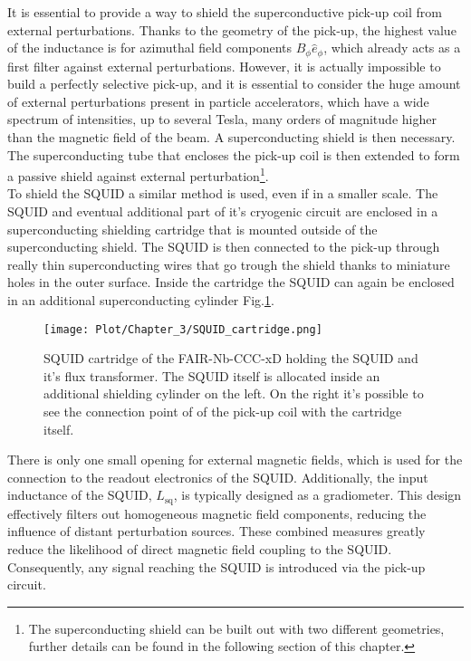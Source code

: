\documentclass[12pt,a4paper]{report}
\begin{document}
    It is essential to provide a way to shield the superconductive pick-up coil from external perturbations. Thanks to the geometry of the pick-up, the highest value of the inductance is for azimuthal field components \( B_{\phi} \hat{e}_{\phi} \), which already acts as a first filter against external perturbations. However, it is actually impossible to build a perfectly selective pick-up, and it is essential to consider the huge amount of external perturbations present in particle accelerators, which have a wide spectrum of intensities, up to several Tesla, many orders of magnitude higher than the magnetic field of the beam. A superconducting shield is then necessary. The superconducting tube that encloses the pick-up coil is then extended to form a passive shield against external perturbation\footnote{The superconducting shield can be built out with two different geometries, further details can be found in the following section of this chapter.}. \\
     To shield the SQUID a similar method is used, even if in a smaller scale. The SQUID and eventual additional part of it's cryogenic circuit are enclosed in a superconducting shielding cartridge that is mounted outside of the superconducting shield. The SQUID is then connected to the pick-up through really thin superconducting wires that go trough the shield thanks to miniature holes in the outer surface. Inside the cartridge the SQUID can again be enclosed in an additional superconducting cylinder Fig.\ref{CH3_SQUID_cartridge}.
    \begin{figure} [H]
    	\centering
    	\texttt{[image: Plot/Chapter\_3/SQUID\_cartridge.png]}
    	\caption{\small{SQUID cartridge of the FAIR-Nb-CCC-xD holding the SQUID and it's flux transformer. The SQUID itself is allocated inside an additional shielding cylinder on the left. On the right it's possible to see the connection point of of the pick-up coil with the cartridge itself.}}
    	\label{CH3_SQUID_cartridge}
    \end{figure}
    	There is only one small opening for external magnetic fields, which is used for the connection to the readout electronics of the SQUID. Additionally, the input inductance of the SQUID, \(L_{\text{sq}}\), is typically designed as a gradiometer. This design effectively filters out homogeneous magnetic field components, reducing the influence of distant perturbation sources. These combined measures greatly reduce the likelihood of direct magnetic field coupling to the SQUID. Consequently, any signal reaching the SQUID is introduced via the pick-up circuit.\\
\end{document}
